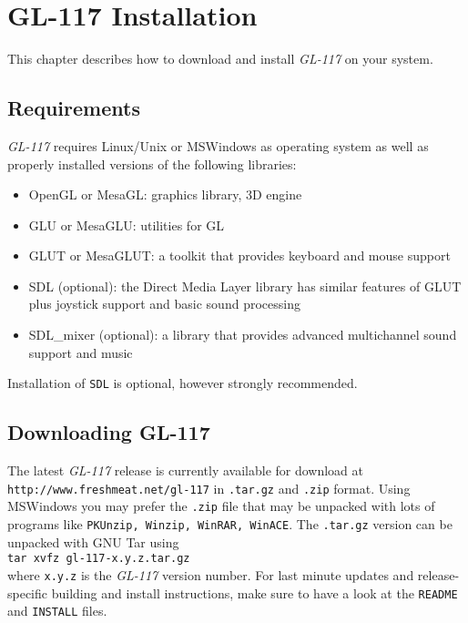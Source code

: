 \chapter{GL-117 Installation}
\label{chap:installation}

This chapter describes how to download and install \emph{GL-117} on your
system.

\section{Requirements}
\label{sec:requirements}

\emph{GL-117} requires Linux/Unix or MSWindows as operating system as well as
properly installed versions of the following libraries:
\begin{itemize}
\item{OpenGL or MesaGL: graphics library, 3D engine}
\item{GLU or MesaGLU: utilities for GL}
\item{GLUT or MesaGLUT: a toolkit that provides keyboard and mouse support}
\item{SDL (optional): the Direct Media Layer library has similar features of GLUT plus joystick
support and basic sound processing}
\item{SDL\_mixer (optional): a library that provides advanced multichannel sound
support and music}
\end{itemize}

Installation of \texttt{SDL} is optional, however strongly recommended.

\section{Downloading GL-117}
\label{sec:downloading_gl117}

The latest \emph{GL-117} release is currently available for download at
\texttt{http://www.freshmeat.net/gl-117} in \texttt{.tar.gz} and \texttt{.zip} format.
Using MSWindows you may prefer the \texttt{.zip} file that may be unpacked with
lots of programs like \texttt{PKUnzip, Winzip, WinRAR, WinACE}.
The \texttt{.tar.gz} version can be unpacked with GNU Tar using \\\texttt{tar xvfz
gl-117-x.y.z.tar.gz}\\ where \texttt{x.y.z} is the \emph{GL-117} version
number. For last minute updates and release-specific building and
install instructions, make sure to have a look at the
\texttt{README} and \texttt{INSTALL} files.

